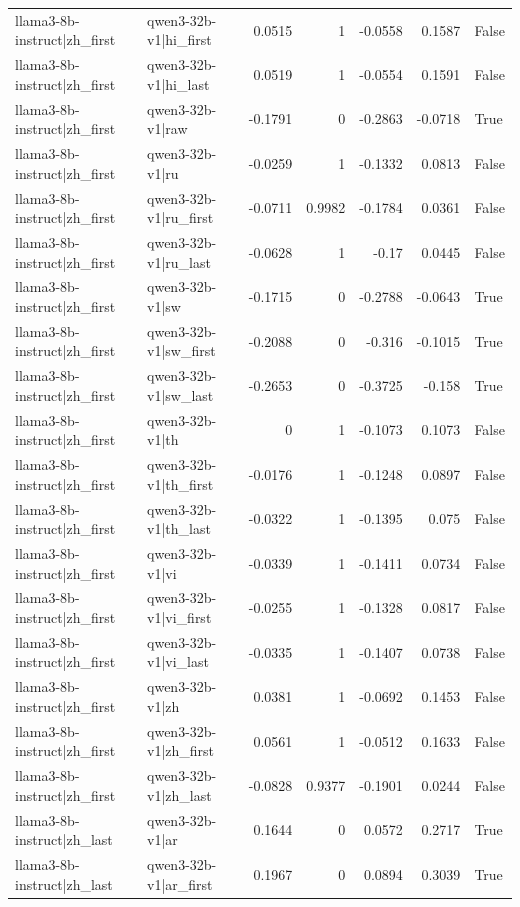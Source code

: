 \begin{table}
\begin{tabular}{l l r r r r l}
llama3-8b-instruct|zh_first & qwen3-32b-v1|hi_first & 0.0515 & 1 & -0.0558 & 0.1587 & False \\
llama3-8b-instruct|zh_first & qwen3-32b-v1|hi_last & 0.0519 & 1 & -0.0554 & 0.1591 & False \\
llama3-8b-instruct|zh_first & qwen3-32b-v1|raw & -0.1791 & 0 & -0.2863 & -0.0718 & True \\
llama3-8b-instruct|zh_first & qwen3-32b-v1|ru & -0.0259 & 1 & -0.1332 & 0.0813 & False \\
llama3-8b-instruct|zh_first & qwen3-32b-v1|ru_first & -0.0711 & 0.9982 & -0.1784 & 0.0361 & False \\
llama3-8b-instruct|zh_first & qwen3-32b-v1|ru_last & -0.0628 & 1 & -0.17 & 0.0445 & False \\
llama3-8b-instruct|zh_first & qwen3-32b-v1|sw & -0.1715 & 0 & -0.2788 & -0.0643 & True \\
llama3-8b-instruct|zh_first & qwen3-32b-v1|sw_first & -0.2088 & 0 & -0.316 & -0.1015 & True \\
llama3-8b-instruct|zh_first & qwen3-32b-v1|sw_last & -0.2653 & 0 & -0.3725 & -0.158 & True \\
llama3-8b-instruct|zh_first & qwen3-32b-v1|th & 0 & 1 & -0.1073 & 0.1073 & False \\
llama3-8b-instruct|zh_first & qwen3-32b-v1|th_first & -0.0176 & 1 & -0.1248 & 0.0897 & False \\
llama3-8b-instruct|zh_first & qwen3-32b-v1|th_last & -0.0322 & 1 & -0.1395 & 0.075 & False \\
llama3-8b-instruct|zh_first & qwen3-32b-v1|vi & -0.0339 & 1 & -0.1411 & 0.0734 & False \\
llama3-8b-instruct|zh_first & qwen3-32b-v1|vi_first & -0.0255 & 1 & -0.1328 & 0.0817 & False \\
llama3-8b-instruct|zh_first & qwen3-32b-v1|vi_last & -0.0335 & 1 & -0.1407 & 0.0738 & False \\
llama3-8b-instruct|zh_first & qwen3-32b-v1|zh & 0.0381 & 1 & -0.0692 & 0.1453 & False \\
llama3-8b-instruct|zh_first & qwen3-32b-v1|zh_first & 0.0561 & 1 & -0.0512 & 0.1633 & False \\
llama3-8b-instruct|zh_first & qwen3-32b-v1|zh_last & -0.0828 & 0.9377 & -0.1901 & 0.0244 & False \\
llama3-8b-instruct|zh_last & qwen3-32b-v1|ar & 0.1644 & 0 & 0.0572 & 0.2717 & True \\
llama3-8b-instruct|zh_last & qwen3-32b-v1|ar_first & 0.1967 & 0 & 0.0894 & 0.3039 & True \\

\end{tabular}
\end{table}
